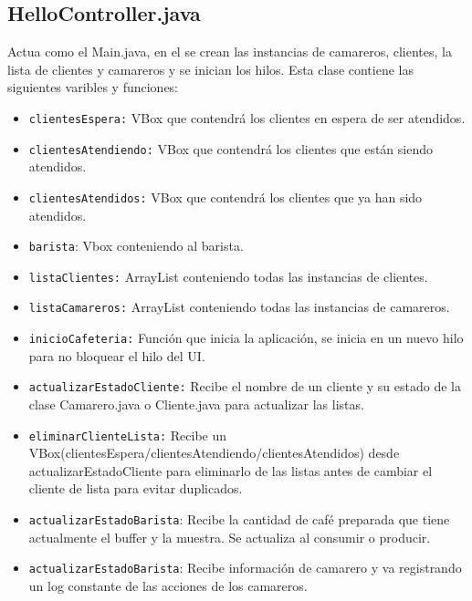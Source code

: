 \documentclass[a4paper,12pt]{article}
\begin{document}
        \subsection{HelloController.java}
        Actua como el Main.java, en el se crean las instancias de camareros, clientes, la lista de clientes y camareros 
        y se inician los hilos.
        Esta clase contiene las siguientes varibles y funciones:
        \begin{itemize}
            \item \texttt{clientesEspera:} VBox que contendrá los clientes en espera de ser atendidos.
            \item \texttt{clientesAtendiendo:} VBox que contendrá los clientes que están siendo atendidos.
            \item \texttt{clientesAtendidos:} VBox que contendrá los clientes que ya han sido atendidos.
            \item \texttt{barista}: Vbox conteniendo al barista.
            \vspace{0.3cm}
            \item \texttt{listaClientes:} ArrayList conteniendo todas las instancias de clientes.
            \item \texttt{listaCamareros:} ArrayList conteniendo todas las instancias de camareros.
            \vspace{0.3cm}
            \item \texttt{inicioCafeteria:} Función que inicia la aplicación, se inicia en un nuevo hilo para no bloquear el hilo del UI.
            \item \texttt{actualizarEstadoCliente:} Recibe el nombre de un cliente y su estado de la clase Camarero.java o Cliente.java para actualizar las listas.
            \item \texttt{eliminarClienteLista:} Recibe un VBox(clientesEspera/clientesAtendiendo/clientesAtendidos) desde actualizarEstadoCliente para eliminarlo de las listas
            antes de cambiar el cliente de lista para evitar duplicados.
            \item \texttt{actualizarEstadoBarista}: Recibe la cantidad de café preparada que tiene actualmente el buffer y la muestra. Se actualiza al consumir o producir.
            \item \texttt{actualizarEstadoBarista}: Recibe información de camarero y va registrando un log constante de las acciones de los camareros.
        \end{itemize}
\end{document}
